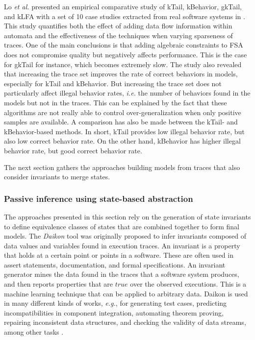 Lo \emph{et al.} presented an empirical comparative study of kTail,
kBehavior, gkTail, and kLFA with a set of 10 case studies
extracted from real software systems in \cite{Lo20122063}. This
study quantifies both the effect of adding data flow information
within automata and the effectiveness of the techniques when
varying sparseness of traces. One of the main conclusions is that
adding algebraic constraints to FSA does not compromise quality
but negatively affects performance. This is the case for gkTail
for instance, which becomes extremely slow. The study also
revealed that increasing the trace set improves the rate of
correct behaviors in models, especially for kTail and kBehavior.
But increasing the trace set does not particularly affect illegal
behavior rates, \emph{i.e.} the number of behaviors found in the models
but not in the traces. This can be explained by the fact that
these algorithms are not really able to control
over-generalization when only positive samples are available. A
comparison has also be made between the kTail- and
kBehavior-based methods. In short, kTail provides low illegal
behavior rate, but also low correct behavior rate. On the other
hand, kBehavior has higher illegal behavior rate, but good
correct behavior rate.

The next section gathers the approaches building models from
traces that also consider invariants to merge states.

\subsubsection{Passive inference using state-based abstraction}
\label{sec:passive-spec}

The approaches presented in this section rely on the generation
of state invariants to define equivalence classes of states that
are combined together to form final models. The \textit{Daikon}
tool \cite{Ernst:1999:DDL:302405.302467} was originally proposed
to infer invariants composed of data values and variables found
in execution traces. An invariant is a property that holds at a
certain point or points in a software. These are often used in
assert statements, documentation, and formal specifications. An
invariant generator mines the data found in the traces that a
software system produces, and then reports properties that are
$true$ over the observed executions.  This is a machine learning
technique that can be applied to arbitrary data. Daikon is used
in many different kinds of works, \emph{e.g.}, for generating test cases,
predicting incompatibilities in component integration, automating
theorem proving, repairing inconsistent data structures, and
checking the validity of data streams, among other tasks
\cite{Ernst200735}.

